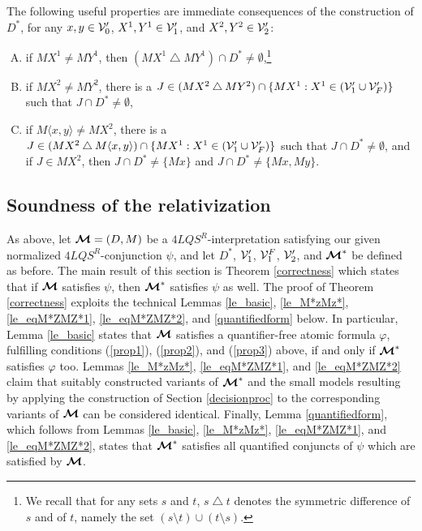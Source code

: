 \documentclass{fundam}
\newcommand{\model}{\ensuremath{\mbox{\boldmath $\mathcal{M}$}}\xspace}
\newcommand{\QLQSR}{\ensuremath{\mbox{$4\mathit{LQS}^{R}$}}\xspace}
\begin{document}
The following useful properties are immediate consequences of the
construction of $D^*$, for any $x,y \in {\cal V}'_0$, $X^1,Y^1 \in
{\cal V}'_1$, and $X^2, Y^2 \in {\cal V}'_2$:
\begin{enumerate}[(A)]
    \item \label{prop1} if $MX^1 \neq MY^1$, then $(MX^1
    \bigtriangleup MY^1) \cap D^{*} \neq \emptyset$,\footnote{We
    recall that for any sets $s$ and $t$, $s \bigtriangleup t$ denotes
    the symmetric difference of $s$ and of $t$, namely the
    set $(s \setminus t)\cup(t \setminus s)$.}

    \item \label{prop2} if $MX^2 \neq MY^2$, there is a $J\in (MX^2
    \bigtriangleup MY^2)\cap \{MX^1 : X^1 \in ({\cal V}'_{1}\cup {\cal
    V}'_{F})\}$ such that $J \cap D^* \neq \emptyset$,

    \item \label{prop3} if $M\langle x,y \rangle \neq MX^2$, there is
    a $J \in (MX^2 \bigtriangleup M\langle x,y \rangle) \cap \{MX^1 :
    X^1 \in ({\cal V}'_{1}\cup {\cal V}'_{F})\}$ such that $J \cap D^*
    \neq \emptyset$, and if $J \in MX^2$, then $J \cap D^* \neq
    \{Mx\}$ and $J \cap D^* \neq \{Mx,My\}$.
\end{enumerate}

\subsection{Soundness of the relativization}
As above, let $\model=(D,M)$ be a $\QLQSR$-interpretation satisfying
our given normalized $\QLQSR$-conjunction $\psi$, and let $D^{*}$,
${\cal V}'_{1}$, ${\cal V}_1^F$, ${\cal V}'_{2}$, and $\model^{*}$ be
defined as before.  The main result of this section is Theorem
\ref{correctness} which states that if $\model$ satisfies $\psi$, then
$\model^*$ satisfies $\psi$ as well.  The proof of Theorem
\ref{correctness} exploits the technical Lemmas \ref{le_basic},
\ref{le_M*zMz*}, \ref{le_eqM*ZMZ*1}, \ref{le_eqM*ZMZ*2}, and
\ref{quantifiedform} below.  In particular, Lemma \ref{le_basic}
states that $\model$ satisfies a quantifier-free atomic formula
$\varphi$, fulfilling conditions (\ref{prop1}), (\ref{prop2}), and
(\ref{prop3}) above, if and only if $\model^*$ satisfies $\varphi$ too.
Lemmas \ref{le_M*zMz*}, \ref{le_eqM*ZMZ*1}, and \ref{le_eqM*ZMZ*2}
claim that suitably constructed variants of $\model^*$ and the small
models resulting by applying the construction of Section
\ref{decisionproc} to the corresponding variants of $\model$ can be
considered identical.
Finally, Lemma \ref{quantifiedform}, which follows from Lemmas
\ref{le_basic}, \ref{le_M*zMz*}, \ref{le_eqM*ZMZ*1}, and
\ref{le_eqM*ZMZ*2}, states that $\model^*$ satisfies all quantified
conjuncts of $\psi$ which are satisfied by $\model$.
\end{document}
